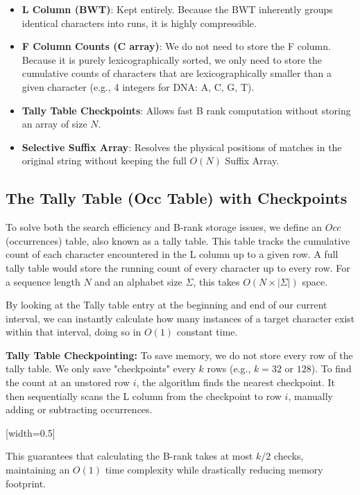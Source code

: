 \begin{itemize}
    \item \textbf{L Column (BWT)}: Kept entirely. Because the BWT inherently groups identical characters into runs, it is highly compressible.
    \item \textbf{F Column Counts (C array)}: We do not need to store the F column. Because it is purely lexicographically sorted, we only need to store the cumulative counts of characters that are lexicographically smaller than a given character (e.g., 4 integers for DNA: A, C, G, T).
    \item \textbf{Tally Table Checkpoints}: Allows fast B rank computation without storing an array of size $N$.
    \item \textbf{Selective Suffix Array}: Resolves the physical positions of matches in the original string without keeping the full $O(N)$ Suffix Array.
\end{itemize}

\subsection{The Tally Table (Occ Table) with Checkpoints}
To solve both the search efficiency and B-rank storage issues, we define an $Occ$ (occurrences) table, also known as a tally table. This table tracks the cumulative count of each character encountered in the L column up to a given row. A full tally table would store the running count of every character up to every row. For a sequence length $N$ and an alphabet size $\Sigma$, this takes $O(N \times |\Sigma|)$ space.

By looking at the Tally table entry at the beginning and end of our current interval, we can instantly calculate how many instances of a target character exist within that interval, doing so in $O(1)$ constant time.

\begin{important}
    \textbf{Tally Table Checkpointing:} To save memory, we do not store every row of the tally table. We only save "checkpoints" every $k$ rows (e.g., $k=32$ or $128$). To find the count at an unstored row $i$, the algorithm finds the nearest checkpoint. It then sequentially scans the L column from the checkpoint to row $i$, manually adding or subtracting occurrences.
\end{important}

[width=0.5\textwidth]

This guarantees that calculating the B-rank takes at most $k/2$ checks, maintaining an $O(1)$ time complexity while drastically reducing memory footprint.

